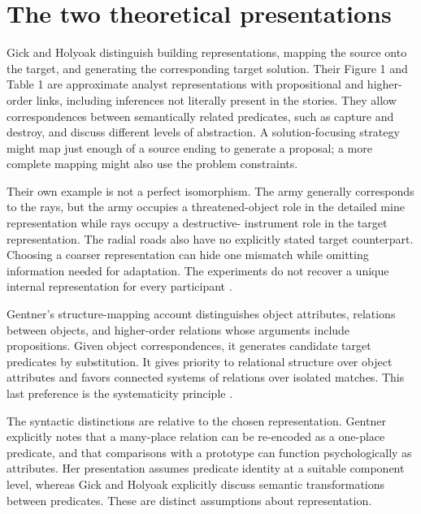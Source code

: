 \section{The two theoretical presentations}
\label{sec:p19-analogy-theories}

Gick and Holyoak distinguish building representations,
mapping the source onto the target, and generating
the corresponding target solution. Their Figure 1
and Table 1 are approximate analyst representations
with propositional and higher-order links, including
inferences not literally present in the stories.
They allow correspondences between semantically
related predicates, such as capture and destroy,
and discuss different levels of abstraction.
A solution-focusing strategy might map just enough
of a source ending to generate a proposal; a more
complete mapping might also use the problem constraints.

Their own example is not a perfect isomorphism.
The army generally corresponds to the rays, but the
army occupies a threatened-object role in the detailed
mine representation while rays occupy a destructive-
instrument role in the target representation. The
radial roads also have no explicitly stated target
counterpart. Choosing a coarser representation can
hide one mismatch while omitting information needed
for adaptation. The experiments do not recover a
unique internal representation for every participant
\cite[pp.~308--316, 346--351]{GickHolyoak1980AnalogicalProblemSolving}.

Gentner's structure-mapping account distinguishes
object attributes, relations between objects, and
higher-order relations whose arguments include
propositions. Given object correspondences, it
generates candidate target predicates by substitution.
It gives priority to relational structure over
object attributes and favors connected systems
of relations over isolated matches. This last
preference is the systematicity principle
\cite[pp.~155--165]{Gentner1983StructureMapping}.

The syntactic distinctions are relative to the
chosen representation. Gentner explicitly notes
that a many-place relation can be re-encoded
as a one-place predicate, and that comparisons
with a prototype can function psychologically
as attributes. Her presentation assumes predicate
identity at a suitable component level, whereas
Gick and Holyoak explicitly discuss semantic
transformations between predicates. These are
distinct assumptions about representation.

